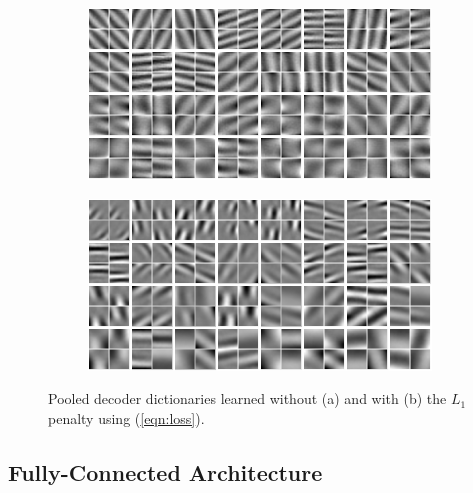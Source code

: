 \begin{figure} \centering \begin{subfigure}[b]{0.45\textwidth}
\includegraphics[width=\textwidth]{./figures/slow/slow_dec_pooling_sub.png}
\caption{} \label{fig:pooldec} \end{subfigure}
\begin{subfigure}[b]{0.45\textwidth}
\includegraphics[width=\textwidth]{./figures/slow/slow_dec_l1_pooling.png}
\caption{} \label{fig:pooll1dec} \end{subfigure} \caption{Pooled decoder
dictionaries learned without (a) and with (b) the $L_1$ penalty using
(\ref{eqn:loss}).} \label{fig:sfpool} \end{figure}

\subsection{Fully-Connected Architecture}

